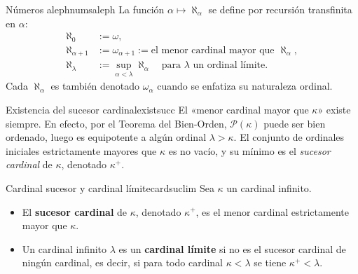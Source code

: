 \begin{definicion}{Números aleph}{numsaleph}
La función $\alpha \mapsto \aleph_\alpha$ se define por recursión transfinita en $\alpha$:
\begin{align*}
  \aleph_0 &:= \omega, \\
  \aleph_{\alpha+1} &:= \omega_{\alpha+1} := \text{el menor cardinal mayor que } \aleph_\alpha, \\
  \aleph_\lambda &:= \sup_{\alpha < \lambda} \aleph_\alpha \quad \text{para } \lambda \text{ un ordinal límite.}
\end{align*}
Cada $\aleph_\alpha$ es también denotado $\omega_\alpha$ cuando se enfatiza su naturaleza ordinal.
\end{definicion}

\begin{observacion}{Existencia del sucesor cardinal}{existsucc}
El «menor cardinal mayor que $\kappa$» existe siempre. En efecto, por el Teorema del Bien-Orden, $\mathcal{P}(\kappa)$ puede ser bien ordenado, luego es equipotente a algún ordinal $\lambda > \kappa$. El conjunto de ordinales iniciales estrictamente mayores que $\kappa$ es no vacío, y su mínimo es el \emph{sucesor cardinal} de $\kappa$, denotado $\kappa^+$.
\end{observacion}

\begin{definicion}{Cardinal sucesor y cardinal límite}{cardsuclim}
Sea $\kappa$ un cardinal infinito.
\begin{itemize}[leftmargin=2em]
  \item El \textbf{sucesor cardinal} de $\kappa$, denotado $\kappa^+$, es el menor cardinal estrictamente mayor que $\kappa$.
  \item Un cardinal infinito $\lambda$ es un \textbf{cardinal límite} si no es el sucesor cardinal de ningún cardinal, es decir, si para todo cardinal $\kappa < \lambda$ se tiene $\kappa^+ < \lambda$.
\end{itemize}
\end{definicion}

